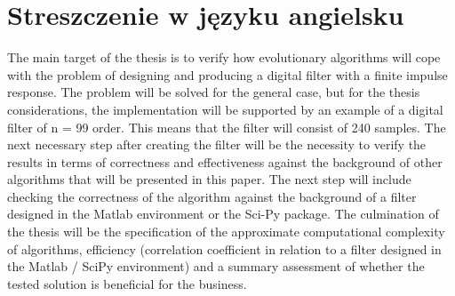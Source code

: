 \documentclass[eng, pl, oneside, openright, final, openbib]{mgr}\DeclareUnicodeCharacter{0301}{\'{e}}
\begin{document}
\section*{Streszczenie w języku angielsku}
The main target of the thesis is to verify how evolutionary algorithms will cope with the problem of designing and producing a digital filter with a finite impulse response. The problem will be solved for the general case, but for the thesis considerations, the implementation will be supported by an example of a digital filter of n = 99 order. This means that the filter will consist of 240 samples. The next necessary step after creating the filter will be the necessity to verify the results in terms of correctness and effectiveness against the background of other algorithms that will be presented in this paper. The next step will include checking the correctness of the algorithm against the background of a filter designed in the Matlab environment or the Sci-Py package. The culmination of the thesis will be the specification of the approximate computational complexity of algorithms, efficiency (correlation coefficient in relation to a filter designed in the Matlab / SciPy environment) and a summary assessment of whether the tested solution is beneficial for the business.
\end{document}
